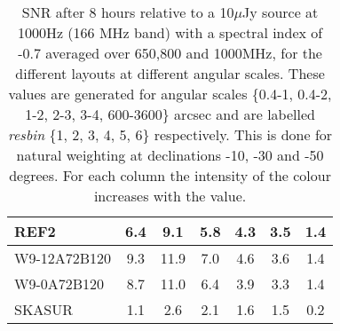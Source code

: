\begin{table}[!htp]
{{\begin{tabular}{|lcccccc|}
REF2 & 6.4 \cellcolor{blue!45.13} & 9.1 \cellcolor{red!47.41} & 5.8 \cellcolor{green!49.18} & 4.3 \cellcolor{orange!55.99} & 3.5 \cellcolor{purple!58.59} & 1.4 \cellcolor{blue!60.00}\\ \hline 
W9-12A72B120 & 9.3 \cellcolor{blue!60.00} & 11.9 \cellcolor{red!60.00} & 7.0 \cellcolor{green!60.00} & 4.6 \cellcolor{orange!60.00} & 3.6 \cellcolor{purple!60.00} & 1.4 \cellcolor{blue!57.18}\\ \hline 
W9-0A72B120 & 8.7 \cellcolor{blue!56.92} & 11.0 \cellcolor{red!56.14} & 6.4 \cellcolor{green!54.55} & 3.9 \cellcolor{orange!50.83} & 3.3 \cellcolor{purple!52.77} & 1.4 \cellcolor{blue!57.53}\\ \hline 
SKASUR & 1.1 \cellcolor{blue!18.00} & 2.6 \cellcolor{red!18.00} & 2.1 \cellcolor{green!18.00} & 1.6 \cellcolor{orange!18.00} & 1.5 \cellcolor{purple!18.00} & 0.2 \cellcolor{blue!18.00}\tabularnewline \hline 
\end{tabular}}\hfill \\

\caption{SNR after 8 hours relative to a 10$\mu$Jy source at 1000Hz (166 MHz band) with a spectral index of -0.7 averaged over 650,800 and 1000MHz, for the different layouts at different angular scales. These values are generated for angular scales \{0.4-1, 0.4-2, 1-2, 2-3, 3-4, 600-3600\} arcsec and are labelled {\it resbin} \{1, 2, 3, 4, 5, 6\} respectively. This is done for natural weighting at declinations -10, -30 and -50 degrees. For each column the intensity of the colour increases with the value.}\label{tab:snravg-band1}}
 \end{table}